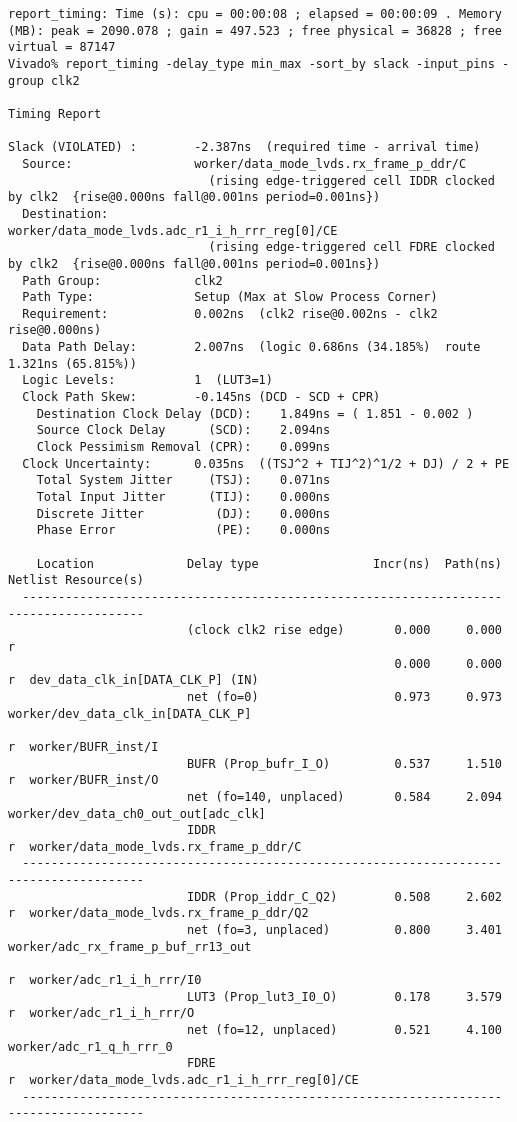 \documentclass{article}
\begin{document}
\begin{lstlisting}
report_timing: Time (s): cpu = 00:00:08 ; elapsed = 00:00:09 . Memory (MB): peak = 2090.078 ; gain = 497.523 ; free physical = 36828 ; free virtual = 87147
Vivado% report_timing -delay_type min_max -sort_by slack -input_pins -group clk2

Timing Report

Slack (VIOLATED) :        -2.387ns  (required time - arrival time)
  Source:                 worker/data_mode_lvds.rx_frame_p_ddr/C
                            (rising edge-triggered cell IDDR clocked by clk2  {rise@0.000ns fall@0.001ns period=0.001ns})
  Destination:            worker/data_mode_lvds.adc_r1_i_h_rrr_reg[0]/CE
                            (rising edge-triggered cell FDRE clocked by clk2  {rise@0.000ns fall@0.001ns period=0.001ns})
  Path Group:             clk2
  Path Type:              Setup (Max at Slow Process Corner)
  Requirement:            0.002ns  (clk2 rise@0.002ns - clk2 rise@0.000ns)
  Data Path Delay:        2.007ns  (logic 0.686ns (34.185%)  route 1.321ns (65.815%))
  Logic Levels:           1  (LUT3=1)
  Clock Path Skew:        -0.145ns (DCD - SCD + CPR)
    Destination Clock Delay (DCD):    1.849ns = ( 1.851 - 0.002 ) 
    Source Clock Delay      (SCD):    2.094ns
    Clock Pessimism Removal (CPR):    0.099ns
  Clock Uncertainty:      0.035ns  ((TSJ^2 + TIJ^2)^1/2 + DJ) / 2 + PE
    Total System Jitter     (TSJ):    0.071ns
    Total Input Jitter      (TIJ):    0.000ns
    Discrete Jitter          (DJ):    0.000ns
    Phase Error              (PE):    0.000ns

    Location             Delay type                Incr(ns)  Path(ns)    Netlist Resource(s)
  -------------------------------------------------------------------    -------------------
                         (clock clk2 rise edge)       0.000     0.000 r  
                                                      0.000     0.000 r  dev_data_clk_in[DATA_CLK_P] (IN)
                         net (fo=0)                   0.973     0.973    worker/dev_data_clk_in[DATA_CLK_P]
                                                                      r  worker/BUFR_inst/I
                         BUFR (Prop_bufr_I_O)         0.537     1.510 r  worker/BUFR_inst/O
                         net (fo=140, unplaced)       0.584     2.094    worker/dev_data_ch0_out_out[adc_clk]
                         IDDR                                         r  worker/data_mode_lvds.rx_frame_p_ddr/C
  -------------------------------------------------------------------    -------------------
                         IDDR (Prop_iddr_C_Q2)        0.508     2.602 r  worker/data_mode_lvds.rx_frame_p_ddr/Q2
                         net (fo=3, unplaced)         0.800     3.401    worker/adc_rx_frame_p_buf_rr13_out
                                                                      r  worker/adc_r1_i_h_rrr/I0
                         LUT3 (Prop_lut3_I0_O)        0.178     3.579 r  worker/adc_r1_i_h_rrr/O
                         net (fo=12, unplaced)        0.521     4.100    worker/adc_r1_q_h_rrr_0
                         FDRE                                         r  worker/data_mode_lvds.adc_r1_i_h_rrr_reg[0]/CE
  -------------------------------------------------------------------    -------------------


\end{lstlisting}
\end{document}
